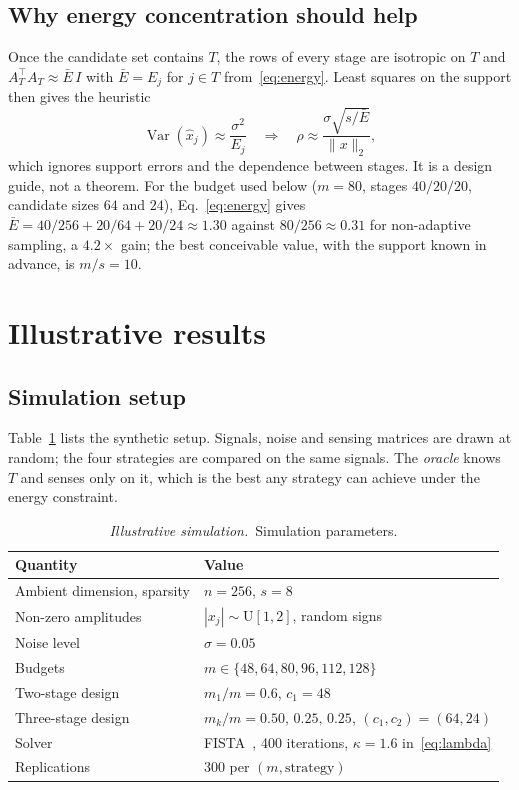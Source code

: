 \documentclass[11pt,a4paper]{article}
\theoremstyle{definition}
\newcommand{\norm}[1]{\lVert #1\rVert}
\newcommand{\illus}{\textit{Illustrative simulation.}\ }
\newcommand{\thead}[1]{\textbf{\lpHeadingFont #1}}
\begin{document}
\subsection{Why energy concentration should help}
Once the candidate set contains $T$, the rows of every stage are isotropic on $T$ and $A_T^{\top}A_T\approx \bar E\,I$ with $\bar E=E_j$ for $j\in T$ from~\eqref{eq:energy}. Least squares on the support then gives the heuristic
\begin{equation}\label{eq:var}
  \operatorname{Var}(\hat x_j)\approx\frac{\sigma^2}{E_j}
  \quad\Longrightarrow\quad
  \rho\approx\frac{\sigma\sqrt{s/\bar E}}{\norm{x}_2},
\end{equation}
which ignores support errors and the dependence between stages. It is a design guide, not a theorem. For the budget used below ($m=80$, stages $40/20/20$, candidate sizes $64$ and $24$), Eq.~\eqref{eq:energy} gives $\bar E=40/256+20/64+20/24\approx1.30$ against $80/256\approx0.31$ for non-adaptive sampling, a $4.2\times$ gain; the best conceivable value, with the support known in advance, is $m/s=10$.

\section{Illustrative results}\label{sec:results}

\subsection{Simulation setup}
Table~\ref{tab:setup} lists the synthetic setup. Signals, noise and sensing matrices are drawn at random; the four strategies are compared on the same signals. The \emph{oracle} knows $T$ and senses only on it, which is the best any strategy can achieve under the energy constraint.

\begin{table}[tbp]
\centering
\caption{\illus Simulation parameters.}\label{tab:setup}
\small
\begin{tabular}{@{}ll@{}}
\toprule
\thead{Quantity} & \thead{Value} \\
\midrule
Ambient dimension, sparsity & $n=256$, $s=8$ \\
Non-zero amplitudes & $|x_j|\sim\mathrm U[1,2]$, random signs \\
Noise level & $\sigma=0.05$ \\
Budgets & $m\in\{48,64,80,96,112,128\}$ \\
Two-stage design & $m_1/m=0.6$, $c_1=48$ \\
Three-stage design & $m_k/m=0.50,\,0.25,\,0.25$, $(c_1,c_2)=(64,24)$ \\
Solver & FISTA~\cite{beck2009}, 400 iterations, $\kappa=1.6$ in~\eqref{eq:lambda} \\
Replications & 300 per $(m,\text{strategy})$ \\
\bottomrule
\end{tabular}
\end{table}
\end{document}
